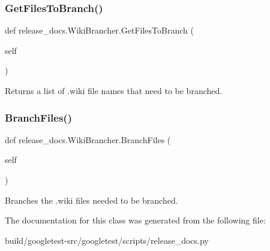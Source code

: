 \subsubsection{\texorpdfstring{Get\+Files\+To\+Branch()}{GetFilesToBranch()}}
{\footnotesize\ttfamily def release\+\_\+docs.\+Wiki\+Brancher.\+Get\+Files\+To\+Branch (\begin{DoxyParamCaption}\item[{}]{self }\end{DoxyParamCaption})}

\begin{DoxyVerb}Returns a list of .wiki file names that need to be branched.\end{DoxyVerb}
 \mbox{\label{classrelease__docs_1_1WikiBrancher_a5ef284f7e1742f465ecd0c14d2667327}} 
\subsubsection{\texorpdfstring{Branch\+Files()}{BranchFiles()}}
{\footnotesize\ttfamily def release\+\_\+docs.\+Wiki\+Brancher.\+Branch\+Files (\begin{DoxyParamCaption}\item[{}]{self }\end{DoxyParamCaption})}

\begin{DoxyVerb}Branches the .wiki files needed to be branched.\end{DoxyVerb}
 

The documentation for this class was generated from the following file\+:\begin{DoxyCompactItemize}
\item 
build/googletest-\/src/googletest/scripts/release\+\_\+docs.\+py\end{DoxyCompactItemize}
